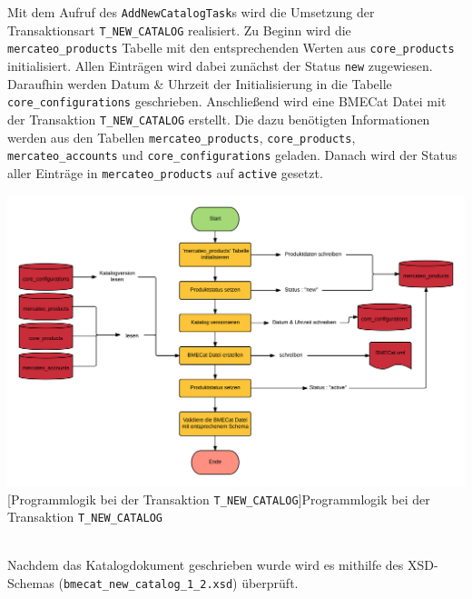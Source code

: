 	Mit dem Aufruf des \texttt{AddNewCatalogTask}s wird die Umsetzung der Transaktionsart \texttt{T\_NEW\_CATALOG} realisiert. Zu Beginn wird die \texttt{mercateo\_products} Tabelle mit den entsprechenden Werten aus \texttt{core\_products} initialisiert. Allen Einträgen wird dabei zunächst der Status \texttt{new} zugewiesen. Daraufhin werden Datum \& Uhrzeit der Initialisierung in die Tabelle \texttt{core\_configurations} geschrieben. Anschließend wird eine BMECat Datei mit der Transaktion \texttt{T\_NEW\_CATALOG} erstellt. Die dazu benötigten Informationen werden aus den Tabellen \texttt{mercateo\_products}, \texttt{core\_products}, \texttt{mercateo\_accounts} und \texttt{core\_configurations} geladen. Danach wird der Status aller Einträge in \texttt{mercateo\_products} auf \texttt{active} gesetzt. 
	
	\begin{minipage}{\linewidth}
		\vspace{1em}
		\centering
		\includegraphics[width=1 \linewidth]{img/newCatalogComplete}
		[Programmlogik  bei der Transaktion \texttt{T\_NEW\_CATALOG}]{Programmlogik  bei der Transaktion \texttt{T\_NEW\_CATALOG}}
		\vspace{1em}
	\end{minipage}\\
	
	Nachdem das Katalogdokument geschrieben wurde wird es mithilfe des  XSD-Schemas (\texttt{bmecat\_new\_catalog\_1\_2.xsd}) überprüft. 


